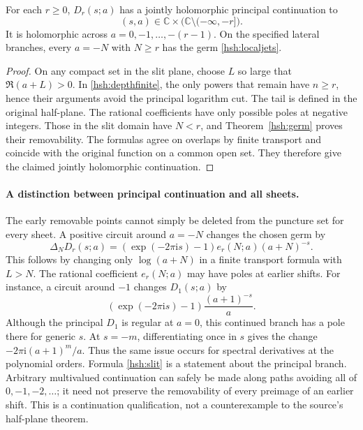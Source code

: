 \begin{corollary}\label{hsh:principal}
For each $r\geq0$, $D_r(s;a)$ has a jointly holomorphic principal
continuation to
\begin{equation}\label{hsh:slit}
       (s,a)\in\mathbb C\times
                         \bigl(\mathbb C\setminus(-\infty,-r]\bigr).
\end{equation}
It is holomorphic across $a=0,-1,\ldots,-(r-1)$.  On the
specified lateral branches, every $a=-N$ with $N\geq r$ has
the germ \eqref{hsh:localjets}.
\end{corollary}

\begin{proof}
On any compact set in the slit plane, choose $L$ so large that
$\Re(a+L)>0$.  In \eqref{hsh:depthfinite}, the only powers that
remain have $n\geq r$, hence their arguments avoid the principal
logarithm cut.  The tail is defined in the original half-plane.
The rational coefficients have only possible poles at negative
integers.  Those in the slit domain have $N<r$, and
Theorem~\ref{hsh:germ} proves their removability.  The formulas
agree on overlaps by finite transport and coincide with the
original function on a common open set.  They therefore give
the claimed jointly holomorphic continuation.
\end{proof}

\paragraph{A distinction between principal continuation and all sheets.}
The early removable points cannot simply be deleted from the
puncture set for every sheet.  A positive circuit around $a=-N$
changes the chosen germ by
\begin{equation}\label{hsh:monodromy}
 \Delta_N D_r(s;a)=
 (\exp(-2\pi\mathrm i s)-1)e_r(N;a)(a+N)^{-s}.
\end{equation}
This follows by changing only $\log(a+N)$ in a finite transport
formula with $L>N$.  The rational coefficient $e_r(N;a)$ may have
poles at earlier shifts.  For instance, a circuit around $-1$
changes $D_1(s;a)$ by
\[
       (\exp(-2\pi\mathrm i s)-1)\frac{(a+1)^{-s}}a.
\]
Although the principal $D_1$ is regular at $a=0$, this continued
branch has a pole there for generic $s$.  At $s=-m$, differentiating
once in $s$ gives the change $-2\pi\mathrm i(a+1)^m/a$.
Thus the same issue occurs for spectral derivatives at the polynomial
orders.  Formula \eqref{hsh:slit} is a statement about the principal
branch.  Arbitrary multivalued continuation can safely be made along
paths avoiding all of $0,-1,-2,\ldots$; it need not preserve the
removability of every preimage of an earlier shift.  This is a
continuation qualification, not a counterexample to the source's
half-plane theorem.

